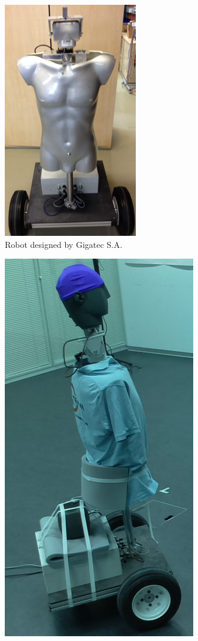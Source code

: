 \begin{figure}[H]
    \centering
    \begin{subfigure}{0.3\linewidth}
        \centering
        \includegraphics[height=0.3\textheight]{files/Robot.png}
        \caption{Robot designed by Gigatec S.A.}
        \label{fig:robot}
    \end{subfigure}
    \hspace{0.5em}
    \begin{subfigure}{0.3\linewidth}
        \centering
        \includegraphics[height=0.3\textheight]{files/Robot2.png}

\end{subfigure}
\end{figure}
